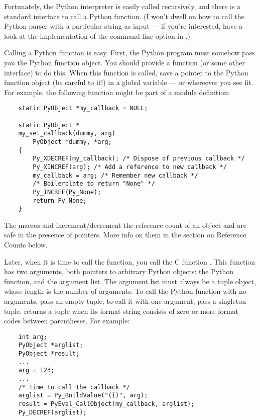 Fortunately, the Python interpreter is easily called recursively, and
there is a standard interface to call a Python function.  (I won't
dwell on how to call the Python parser with a particular string as
input --- if you're interested, have a look at the implementation of
the  command line option in .)

Calling a Python function is easy.  First, the Python program must
somehow pass you the Python function object.  You should provide a
function (or some other interface) to do this.  When this function is
called, save a pointer to the Python function object (be careful to
 it!) in a global variable --- or whereever you see fit.
For example, the following function might be part of a module
definition:

\begin{verbatim}
    static PyObject *my_callback = NULL;

    static PyObject *
    my_set_callback(dummy, arg)
        PyObject *dummy, *arg;
    {
        Py_XDECREF(my_callback); /* Dispose of previous callback */
        Py_XINCREF(arg); /* Add a reference to new callback */
        my_callback = arg; /* Remember new callback */
        /* Boilerplate to return "None" */
        Py_INCREF(Py_None);
        return Py_None;
    }
\end{verbatim}

The macros  and  increment/decrement
the reference count of an object and are safe in the presence of
 pointers.  More info on them in the section on Reference
Counts below.

Later, when it is time to call the function, you call the C function
.  This function has two arguments, both
pointers to arbitrary Python objects: the Python function, and the
argument list.  The argument list must always be a tuple object, whose
length is the number of arguments.  To call the Python function with
no arguments, pass an empty tuple; to call it with one argument, pass
a singleton tuple.   returns a tuple when its
format string consists of zero or more format codes between
parentheses.  For example:

\begin{verbatim}
    int arg;
    PyObject *arglist;
    PyObject *result;
    ...
    arg = 123;
    ...
    /* Time to call the callback */
    arglist = Py_BuildValue("(i)", arg);
    result = PyEval_CallObject(my_callback, arglist);
    Py_DECREF(arglist);
\end{verbatim}

